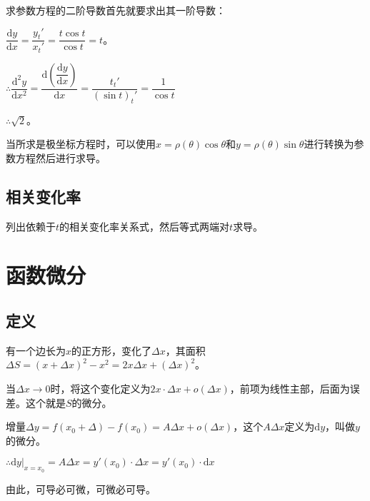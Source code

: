 \documentclass[UTF8, 12pt]{ctexart}
\begin{document}
求参数方程的二阶导数首先就要求出其一阶导数：\medskip

$\dfrac{\textrm{d}y}{\textrm{d}x}=\dfrac{y_t'}{x_t'}=\dfrac{t\cos t}{\cos t}=t$。\medskip

$\therefore\dfrac{\textrm{d}^2y}{\textrm{d}x^2}=\dfrac{\textrm{d}\left(\dfrac{\textrm{d}y}{\textrm{d}x}\right)}{\textrm{d}x}=\dfrac{t_t'}{(\sin t)_t'}=\dfrac{1}{\cos t}$\medskip

$\therefore \sqrt{2}$。

当所求是极坐标方程时，可以使用$x=\rho(\theta)\cos\theta$和$y=\rho(\theta)\sin\theta$进行转换为参数方程然后进行求导。

\subsection{相关变化率}

列出依赖于$t$的相关变化率关系式，然后等式两端对$t$求导。

\section{函数微分}

\subsection{定义}

有一个边长为$x$的正方形，变化了$\Delta x$，其面积$\Delta S=(x+\Delta x)^2-x^2=2x\Delta x+(\Delta x)^2$。

当$\Delta x\to 0$时，将这个变化定义为$2x\cdot\Delta x+o(\Delta x)$，前项为线性主部，后面为误差。这个就是$S$的微分。

增量$\Delta y=f(x_0+\Delta)-f(x_0)=A\Delta x+o(\Delta x)$，这个$A\Delta x$定义为$\textrm{d}y$，叫做$y$的微分。

$\therefore \textrm{d}y\vert_{x=x_0}=A\Delta x=y'(x_0)\cdot\Delta x=y'(x_0)\cdot\textrm{d}x$

由此，可导必可微，可微必可导。
\end{document}
